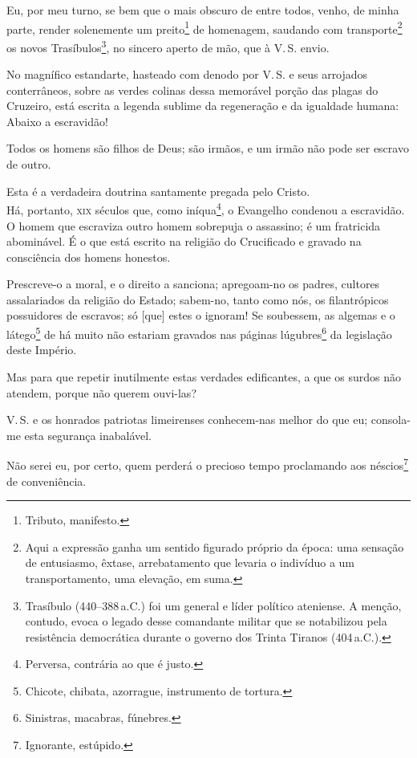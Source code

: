 Eu, por meu turno, se bem que o mais obscuro de entre todos, venho, de
minha parte, render solenemente um preito\footnote{Tributo, manifesto.}
de homenagem, saudando com transporte\footnote{Aqui a expressão ganha
  um sentido figurado próprio da época: uma sensação de entusiasmo,
  êxtase, arrebatamento que levaria o indivíduo a um transportamento,
  uma elevação, em suma.} os novos Trasíbulos\footnote{Trasíbulo
  (440--388\,a.C.) foi um general e líder político ateniense. A menção,
  contudo, evoca o legado desse comandante militar que se notabilizou
  pela resistência democrática durante o governo dos Trinta Tiranos (404\,a.C.).}, 
  no sincero aperto de mão, que à V.\,S. envio.

No magnífico estandarte, hasteado com denodo por V.\,S. e seus arrojados
conterrâneos, sobre as verdes colinas dessa memorável porção das plagas
do Cruzeiro, está escrita a legenda sublime da regeneração e da
igualdade humana: Abaixo a escravidão!

Todos os homens são filhos de Deus; são irmãos, e um irmão não pode ser
escravo de outro.

Esta é a verdadeira doutrina santamente pregada pelo Cristo.\\
Há, portanto, \textsc{xix} séculos que, como iníqua\footnote{Perversa,
  contrária ao que é justo.}, o Evangelho condenou a escravidão.\\
O homem que escraviza outro homem sobrepuja o assassino; é um fratricida
abominável. É o que está escrito na religião do Crucificado e gravado na
consciência dos homens honestos.

Prescreve-o a moral, e o direito a sanciona; apregoam-no os padres,
cultores assalariados da religião do Estado; sabem-no, tanto como nós,
os filantrópicos possuidores de escravos; só {[}que{]} estes o ignoram!
Se soubessem, as algemas e o látego\footnote{Chicote, chibata,
  azorrague, instrumento de tortura.} de há muito não estariam gravados
nas páginas lúgubres\footnote{Sinistras, macabras, fúnebres.} da
legislação deste Império.

Mas para que repetir inutilmente estas verdades edificantes, a que os
surdos não atendem, porque não querem ouvi-las?

V.\,S. e os honrados patriotas limeirenses conhecem-nas melhor do que eu;
consola-me esta segurança inabalável.

Não serei eu, por certo, quem perderá o precioso tempo proclamando aos
néscios\footnote{Ignorante, estúpido.} de conveniência.

